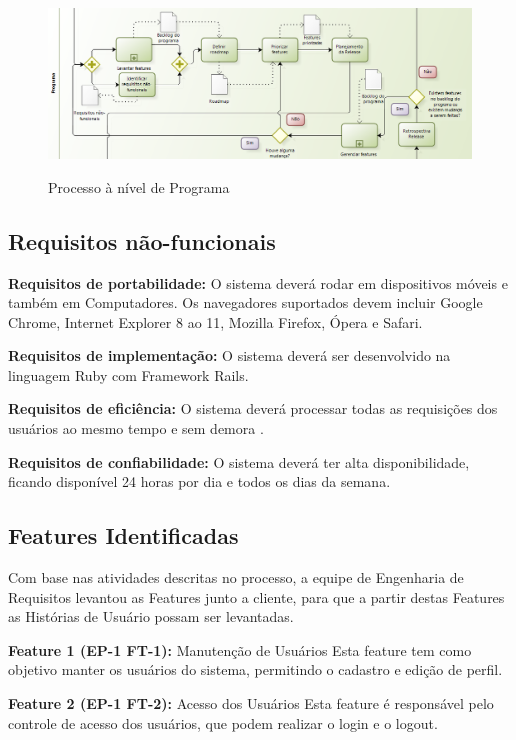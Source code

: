 \FloatBarrier
\begin{figure}[!htpd]
		\centering
		\includegraphics[scale=0.4]{figuras/programa}
		\label{img:programa}
		\caption{Processo à nível de Programa}
\end{figure}

\subsection{Requisitos não-funcionais}

\textbf{Requisitos de portabilidade:} O sistema deverá rodar em dispositivos móveis e também em Computadores. Os navegadores suportados devem incluir Google Chrome, Internet Explorer 8 ao 11, Mozilla Firefox, Ópera e Safari.

\textbf{Requisitos de implementação:} O sistema deverá ser desenvolvido na linguagem Ruby com Framework Rails.

\textbf{Requisitos de eficiência:} O sistema deverá processar todas as requisições dos usuários ao mesmo tempo e sem demora .

\textbf{Requisitos de confiabilidade:} O sistema deverá ter alta disponibilidade, ficando disponível 24 horas por dia e todos os dias da semana.

\subsection{Features Identificadas}
Com base nas atividades descritas no processo, a equipe de Engenharia de Requisitos levantou as Features junto a cliente, para que a partir destas Features as Histórias de Usuário possam ser levantadas.

\textbf{Feature 1 (EP-1 FT-1):} Manutenção de Usuários
Esta feature tem como objetivo manter os usuários do sistema, permitindo o cadastro e edição de perfil.

\textbf{Feature 2 (EP-1 FT-2):} Acesso dos Usuários
Esta feature é responsável pelo controle de acesso dos usuários, que podem realizar o login e o logout.


